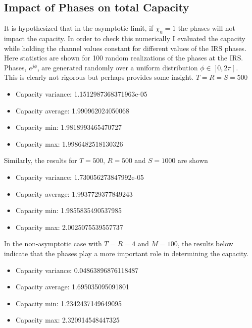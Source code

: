 \documentclass[12pt,a4paper]{report}
\begin{document}
\subsection{Impact of Phases on total Capacity}\label{phase_impact}
It is hypothesized that in the asymptotic limit, if $\chi_n = 1$ the phases will not impact the capacity. In order to check this numerically I evaluated the capacity while holding the channel values constant for different values of the IRS phases. Here statistics are shown for 100 random realizations of the phases at the IRS. 
Phases, $e^{j\phi}$, are generated randomly over a uniform distribution $\phi \in [0,2\pi]$. This is clearly not rigorous but perhaps provides some insight. 
$T = R = S = 500$
\begin{itemize}
\item
Capacity variance:
 1.1512987368371963e-05
 \item
Capacity average:
 1.990962024050068
 \item
Capacity min:
 1.9818993465470727
 \item
Capacity max:
 1.9986482518130326
\end{itemize}
Similarly, the results for $T = 500$, $ R = 500$ and $S = 1000$ are shown 
\begin{itemize}
\item
Capacity variance:
 1.730056273847992e-05
 \item 
Capacity average:
 1.9937729377849243
 \item
Capacity min:
 1.9855835490537985
 \item
Capacity max:
 2.0025075539557737
\end{itemize}


In the non-asymptotic case with $T = R = 4$ and $M = 100$, the results below indicate that the phases play a more important role in determining the capacity. 

\begin{itemize}
\item 
Capacity variance:
 0.04863896876118487
 \item
Capacity average:
 1.695035095091801
 \item
Capacity min:
 1.2342437149649095
 \item
Capacity max:
 2.320914548447325
\end{itemize}






\end{document}
